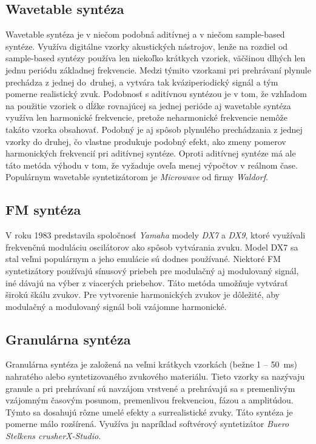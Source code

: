 \subsection{Wavetable syntéza}
Wavetable syntéza je v niečom podobná aditívnej a v niečom sample-based syntéze. Využíva digitálne vzorky akustických nástrojov, lenže na rozdiel od sample-based syntézy používa len niekoľko krátkych vzoriek, väčšinou dlhých len jednu periódu základnej frekvencie. Medzi týmito vzorkami pri prehrávaní plynule prechádza z jednej do~druhej, a vytvára tak kváziperiodický signál a tým pomerne realistický zvuk. Podobnosť s aditívnou syntézou je v tom, že vzhľadom na použitie vzoriek o dĺžke rovnajúcej sa jednej perióde aj wavetable syntéza využíva len harmonické frekvencie, pretože neharmonické frekvencie nemôže takáto vzorka obsahovať. Podobný je aj spôsob plynulého prechádzania z jednej vzorky do druhej, čo vlastne produkuje podobný efekt, ako zmeny pomerov harmonických frekvencií pri aditívnej syntéze. Oproti aditívnej syntéze má ale táto metóda výhodu v tom, že vyžaduje oveľa menej výpočtov v reálnom čase. Populárnym wavetable syntetizátorom je \emph{Microwave} od firmy \emph{Waldorf}.

\subsection{FM syntéza}
V roku 1983 predstavila spoločnosť \emph{Yamaha} modely \emph{DX7} a \emph{DX9}, ktoré využívali frekvenčnú moduláciu oscilátorov ako spôsob vytvárania zvuku. Model DX7 sa stal veľmi populárnym a jeho emulácie sú dodnes používané. Niektoré FM syntetizátory používajú sínusový priebeh pre modulačný aj modulovaný signál, iné dávajú na výber z viacerých priebehov. Táto metóda umožňuje vytvárať širokú škálu zvukov. Pre vytvorenie harmonických zvukov je dôležité, aby modulačný a modulovaný signál boli vzájomne harmonické. 

\subsection{Granulárna syntéza}

Granulárna syntéza je založená na veľmi krátkych vzorkách (bežne 1 -- 50~ms) nahratého alebo syntetizovaného zvukového materiálu. Tieto vzorky sa nazývaju granule a pri prehrávaní sú navzájom vrstvené a prehrávajú sa s premenlivým vzájomným časovým posunom, premenlivou frekvenciou, fázou a amplitúdou. Týmto sa dosahujú rôzne umelé efekty a surrealistické zvuky. Táto syntéza je pomerne málo rozšírená. Využíva ju napríklad softvérový syntetizátor \emph{Buero Stelkens crusherX-Studio}.

